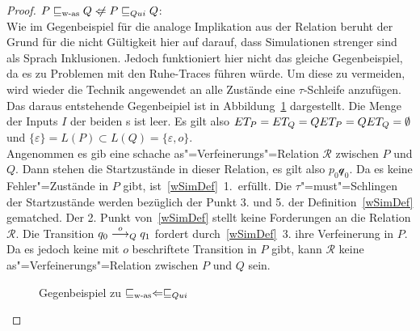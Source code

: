 \begin{proof}
  $P \wasRel Q \hspace{0.1cm}\not\hspace{-0.1cm}\Leftarrow P \QRel Q$:\\
  Wie im Gegenbeispiel für die analoge Implikation aus der Relation \ERel{}
  beruht der Grund für die nicht Gültigkeit hier auf darauf, dass Simulationen
  strenger sind als Sprach Inklusionen. Jedoch funktioniert hier nicht das
  gleiche Gegenbeispiel, da es zu Problemen mit den Ruhe-Traces führen würde.
  Um diese zu vermeiden, wird wieder die Technik angewendet an alle Zustände
  eine $\tau$-Schleife anzufügen. Das daraus entstehende Gegenbeipiel ist in
  Abbildung~\ref{WasQuiGegenBsp} dargestellt. Die Menge der Inputs $I$ der
  beiden \MEIO{}s ist leer. Es gilt also $ET _P = ET _Q = QET _P = QET _Q =
  \emptyset$ und $\{\varepsilon\} = L(P) \subset L(Q) = \{\varepsilon , o\}$.\\
  Angenommen es gib eine schache as"=Verfeinerungs"=Relation $\mathcal{R}$
  zwischen $P$ und $Q$. Dann stehen die Startzustände in dieser Relation, es
  gilt also $p_0 \mathcal q_0$. Da es keine Fehler"=Zustände in $P$ gibt,
  ist~\ref{wSimDef}~1.\ erfüllt. Die $\tau$"=must"=Schlingen der
  Startzustände werden bezüglich der Punkt 3. und 5. der
  Definition~\ref{wSimDef} gematched. Der 2. Punkt von~\ref{wSimDef} stellt
  keine Forderungen an die Relation $\mathcal{R}$. Die Transition $q_0
  \must[o]_Q q_1$ fordert durch~\ref{wSimDef}~3. ihre Verfeinerung in $P$. Da
  es jedoch keine mit $o$ beschriftete Transition in $P$ gibt, kann
  $\mathcal{R}$ keine as"=Verfeinerungs"=Relation zwischen $P$ und $Q$ sein.

  \begin{figure}[htbp]
    \begin{center}
      \caption{Gegenbeispiel zu $\sqsubseteq _{\mathrm{w}\text{-}\mathrm{as}} \Leftarrow  \sqsubseteq  _{Qui}$}
      \label{WasQuiGegenBsp}
    \end{center}
  \end{figure}


\end{proof}
